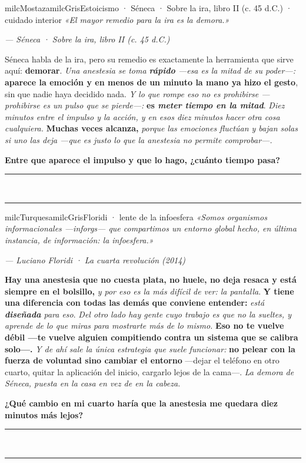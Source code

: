 \documentclass[11pt,letterpaper]{article}
\newcommand{\linead}[1]{\noindent\color{milcLinea}\rule{#1}{0.5pt}\color{milcNegro}}
\begin{document}
\begin{softbox}{milcMostaza}{milcGris}{Estoicismo · Séneca · Sobre la ira, libro II (c. 45 d.C.) · cuidado interior}
\textit{«El mayor remedio para la ira es la demora.»}

{\footnotesize\itshape\color{milcNegro!70}--- Séneca · Sobre la ira, libro II (c. 45 d.C.)}

Séneca habla de la ira, pero su remedio es exactamente la herramienta que sirve aquí: \textbf{demorar}. \emph{Una anestesia se toma \textbf{rápido} ---esa es la mitad de su poder---:} \textbf{aparece la emoción y en menos de un minuto la mano ya hizo el gesto}, sin que nadie haya decidido nada. \emph{Y lo que rompe eso no es prohibirse ---prohibirse es un pulso que se pierde---:} \textbf{es \emph{meter tiempo en la mitad}}. \emph{Diez minutos entre el impulso y la acción, y en esos diez minutos hacer otra cosa cualquiera.} \textbf{Muchas veces alcanza,} \emph{porque las emociones fluctúan y bajan solas si uno las deja ---que es justo lo que la anestesia no permite comprobar---.}

\textbf{Entre que aparece el impulso y que lo hago, ¿cuánto tiempo pasa?}
\end{softbox}
\linead{\linewidth}\\[1mm]
\linead{\linewidth}

\begin{softbox}{milcTurquesa}{milcGris}{Floridi · lente de la infoesfera}
\textit{«Somos organismos informacionales ---inforgs--- que compartimos un entorno global hecho, en última instancia, de información: la infoesfera.»}

{\footnotesize\itshape\color{milcNegro!70}--- Luciano Floridi · La cuarta revolución (2014)}

\textbf{Hay una anestesia que no cuesta plata, no huele, no deja resaca y está siempre en el bolsillo,} \emph{y por eso es la más difícil de ver: la pantalla}. \textbf{Y tiene una diferencia con todas las demás que conviene entender:} \emph{está \textbf{diseñada} para eso}. \emph{Del otro lado hay gente cuyo trabajo es que no la sueltes, y aprende de lo que miras para mostrarte más de lo mismo.} \textbf{Eso no te vuelve débil ---te vuelve alguien compitiendo contra un sistema que se calibra solo---.} \emph{Y de ahí sale la única estrategia que suele funcionar:} \textbf{no pelear con la fuerza de voluntad sino cambiar el entorno} ---dejar el teléfono en otro cuarto, quitar la aplicación del inicio, cargarlo lejos de la cama---. \emph{La demora de Séneca, puesta en la casa en vez de en la cabeza.}

\textbf{¿Qué cambio en mi cuarto haría que la anestesia me quedara diez minutos más lejos?}
\end{softbox}
\linead{\linewidth}\\[1mm]
\linead{\linewidth}
\end{document}
